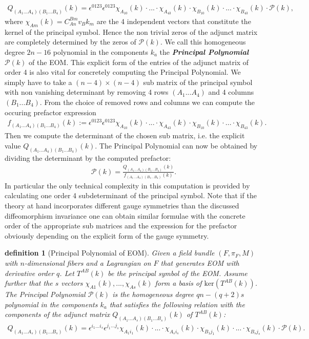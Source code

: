 \documentclass[a4paper,12pt, DIV=14, BCOR=5mm, twoside, headsepline, numbers=noenddot]{scrbook}
\newtheorem{definition}{definition}[section]
\begin{document}
\begin{align}\label{diffeoMinor}
    Q_{(A_1...A_4) (B_1...B_4)}(k) = \epsilon^{0123} \epsilon^{0123} \chi_{A_10}(k) \cdot ... \cdot \chi_{A_43}(k) \cdot \chi_{B_10}(k) \cdot ... \cdot \chi_{B_43}(k) \cdot \mathcal{P}(k),
\end{align}
% 
%
%
%
where $\chi_{Am}(k) = C^{Bm}_{An} v_B k_m$ are the 4 independent vectors that constitute the kernel of the principal symbol. Hence the non trivial zeros of the adjunct matrix are completely determined by the zeros of $\mathcal{P}(k)$. We call this homogeneous degree $2n-16$ polynomial in the components $k_a$ the \textit{\textbf{Principal Polynomial}}  $\mathcal{P}(k)$ of the EOM.
This explicit form of the entries of the adjunct matrix of order 4 is also vital for concretely computing the Principal Polynomial. We simply have to take a $(n-4) \times (n-4)$ sub matrix of the principal symbol with non vanishing determinant by removing 4 rows $(A_1...A_4)$ and 4 columns $(B_1...B_4)$. From the choice of removed rows and columns we can compute the occuring prefactor expression 
\begin{align}\label{prefacF}
f_{(A_1...A_4)(B_1...B_4)}(k) := \epsilon^{0123} \epsilon^{0123} \chi_{A_10}(k) \cdot ... \cdot \chi_{A_43}(k) \cdot \chi_{B_10}(k) \cdot ... \cdot \chi_{B_43}(k).
\end{align}
Then we compute the determinant of the chosen sub matrix, i.e. the explicit value $Q_{(A_1...A_4)(B_1...B_4)}(k)$. The Principal Polynomial can now be obtained by dividing the determinant by the computed prefactor:
\begin{align}
    \mathcal{P}(k) = \frac{Q_{(A_1...A_4)(B_1...B_4)}(k)}{f_{(A_1...A_4)(B_1...B_4)}(k)}.
\end{align}
In particular the only technical complexity in this computation is provided by calculating one order 4 subdeterminant of the principal symbol. 
Note that if the theory at hand incorporates different gauge symmetries than the discussed diffeomorphism invariance one can obtain similar formulae with the concrete order of the appropriate sub matrices and the expression for the prefactor obviously depending on the explicit form of the gauge symmetry.
\begin{definition}[Principal Polynomial of EOM]
Given a field bundle $(F,\pi_F,M)$ with $n$-dimensional fibers and a Lagrangian on $F$ that generates EOM with derivative order $q$. Let  $T^{AB}(k)$ be the principal symbol of the EOM. Assume further that the $s$ vectors $\chi_{A1}(k),...,\chi_{As}(k)$ form a basis of $\mathrm{ker}(T^{AB}(k))$. The Principal Polynomial $\mathcal{P}(k)$
is the homogeneous degree $qn - (q+2)s$ polynomial in the components $k_a$ that satisfies the following relation with the components of the adjunct matrix $Q_{(A_1...A_s)(B_1...B_s)}(k)$ of $T^{AB}(k)$:
\begin{align}
   Q_{(A_1...A_s)(B_1...B_s)}(k) = \epsilon^{i_1...i_s} \epsilon^{j_1...j_s} \chi_{A_1i_1}(k)\cdot ... \cdot \chi_{A_si_s}(k) \cdot \chi_{B_1j_1}(k) \cdot ... \cdot \chi_{B_sj_s}(k) \cdot \mathcal{P}(k).
\end{align}
\end{definition}
\end{document}
